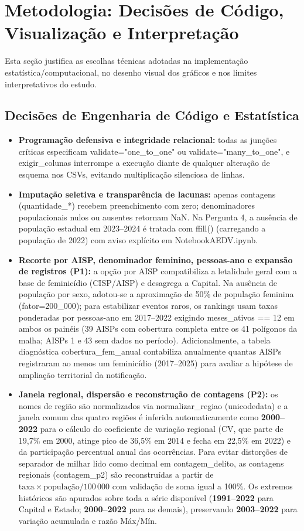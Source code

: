 \documentclass[11pt,a4paper]{article}
\newcommand{\code}[1]{{\ttfamily\footnotesize\allowbreak #1}}
\begin{document}
\section{Metodologia: Decisões de Código, Visualização e Interpretação}

Esta seção justifica as escolhas técnicas adotadas na implementação estatística/computacional, no desenho visual dos gráficos e nos limites interpretativos do estudo.

\subsection{Decisões de Engenharia de Código e Estatística}
\begin{itemize}
  \setlength{\itemsep}{3pt}\setlength{\parskip}{0pt}
  \item \textbf{Programação defensiva e integridade relacional:} todas as junções críticas especificam \code{validate="one\_to\_one"} ou \code{validate="many\_to\_one"}, e \code{exigir\_colunas} interrompe a execução diante de qualquer alteração de esquema nos CSVs, evitando multiplicação silenciosa de linhas.
  \item \textbf{Imputação seletiva e transparência de lacunas:} apenas contagens (\code{quantidade\_*}) recebem preenchimento com zero; denominadores populacionais nulos ou ausentes retornam \code{NaN}. Na Pergunta 4, a ausência de população estadual em 2023--2024 é tratada com \code{ffill()} (carregando a população de 2022) com aviso explícito em \code{NotebookAEDV.ipynb}.
  \item \textbf{Recorte por AISP, denominador feminino, pessoas-ano e expansão de registros (P1):} a opção por AISP compatibiliza a letalidade geral com a base de feminicídio (CISP/AISP) e desagrega a Capital. Na ausência de população por sexo, adotou-se a aproximação de 50\% de população feminina (\code{fator=200\_000}); para estabilizar eventos raros, os rankings usam taxas ponderadas por pessoas-ano em 2017--2022 exigindo \code{meses\_ativos == 12} em ambos os painéis (39 AISPs com cobertura completa entre os 41 polígonos da malha; AISPs 1 e 43 sem dados no período). Adicionalmente, a tabela diagnóstica \code{cobertura\_fem\_anual} contabiliza anualmente quantas AISPs registraram ao menos um feminicídio (2017--2025) para avaliar a hipótese de ampliação territorial da notificação.
  \item \textbf{Janela regional, dispersão e reconstrução de contagens (P2):} os nomes de região são normalizados via \code{normalizar\_regiao} (\code{unicodedata}) e a janela comum das quatro regiões é inferida automaticamente como \textbf{2000--2022} para o cálculo do coeficiente de variação regional (CV, que parte de 19,7\% em 2000, atinge pico de 36,5\% em 2014 e fecha em 22,5\% em 2022) e da participação percentual anual das ocorrências. Para evitar distorções de separador de milhar lido como decimal em \code{contagem\_delito}, as contagens regionais (\code{contagem\_p2}) são reconstruídas a partir de $\text{taxa} \times \text{população} / 100\,000$ com validação de soma igual a 100\%. Os extremos históricos são apurados sobre toda a série disponível (\textbf{1991--2022} para Capital e Estado; \textbf{2000--2022} para as demais), preservando \textbf{2003--2022} para variação acumulada e razão Máx/Mín.

\end{itemize}
\end{document}
